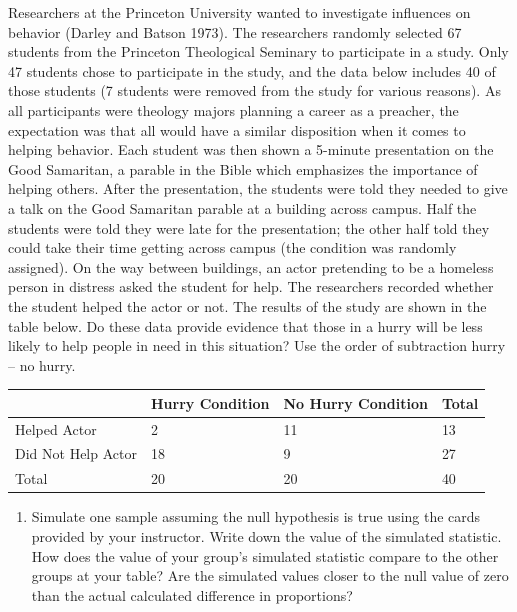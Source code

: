 \documentclass[
]{report}
\providecommand{\tightlist}{%
  \setlength{\itemsep}{0pt}\setlength{\parskip}{0pt}}
\begin{document}
Researchers at the Princeton University wanted to investigate influences on behavior (Darley and Batson 1973). The researchers randomly selected 67 students from the Princeton Theological Seminary to participate in a study. Only 47 students chose to participate in the study, and the data below includes 40 of those students (7 students were removed from the study for various reasons). As all participants were theology majors planning a career as a preacher, the expectation was that all would have a similar disposition when it comes to helping behavior. Each student was then shown a 5-minute presentation on the Good Samaritan, a parable in the Bible which emphasizes the importance of helping others. After the presentation, the students were told they needed to give a talk on the Good Samaritan parable at a building across campus. Half the students were told they were late for the presentation; the other half told they could take their time getting across campus (the condition was randomly assigned). On the way between buildings, an actor pretending to be a homeless person in distress asked the student for help. The researchers recorded whether the student helped the actor or not. The results of the study are shown in the table below. Do these data provide evidence that those in a hurry will be less likely to help people in need in this situation? Use the order of subtraction hurry -- no hurry.

\begin{longtable}[]{@{}llll@{}}
\toprule\noalign{}
& Hurry Condition & No Hurry Condition & Total \\
\midrule\noalign{}
\endhead
\bottomrule\noalign{}
\endlastfoot
Helped Actor & 2 & 11 & 13 \\
Did Not Help Actor & 18 & 9 & 27 \\
Total & 20 & 20 & 40 \\
\end{longtable}

\newpage

\begin{enumerate}
\def\labelenumi{\arabic{enumi}.}
\tightlist
\item
  Simulate one sample assuming the null hypothesis is true using the cards provided by your instructor. Write down the value of the simulated statistic. How does the value of your group's simulated statistic compare to the other groups at your table? Are the simulated values closer to the null value of zero than the actual calculated difference in proportions?
\end{enumerate}
\end{document}
